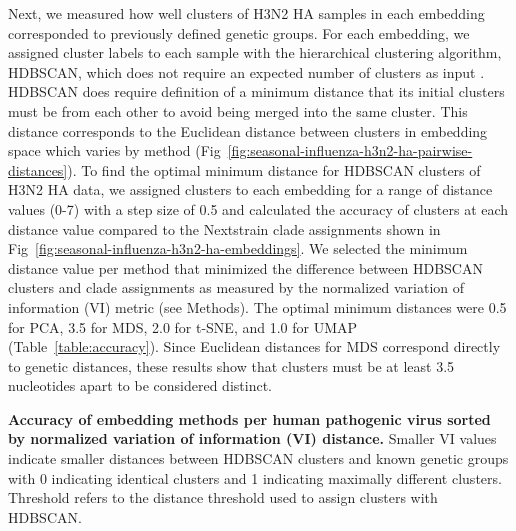 \documentclass[10pt,letterpaper]{article}
\begin{document}
Next, we measured how well clusters of H3N2 HA samples in each embedding corresponded to previously defined genetic groups.
For each embedding, we assigned cluster labels to each sample with the hierarchical clustering algorithm, HDBSCAN, which does not require an expected number of clusters as input \cite{campello2015hierarchical}.
HDBSCAN does require definition of a minimum distance that its initial clusters must be from each other to avoid being merged into the same cluster.
This distance corresponds to the Euclidean distance between clusters in embedding space which varies by method (Fig~\ref{fig:seasonal-influenza-h3n2-ha-pairwise-distances}).
To find the optimal minimum distance for HDBSCAN clusters of H3N2 HA data, we assigned clusters to each embedding for a range of distance values (0-7) with a step size of 0.5 and calculated the accuracy of clusters at each distance value compared to the Nextstrain clade assignments shown in Fig~\ref{fig:seasonal-influenza-h3n2-ha-embeddings}.
We selected the minimum distance value per method that minimized the difference between HDBSCAN clusters and clade assignments as measured by the normalized variation of information (VI) metric \cite{meilua2003comparing} (see Methods).
The optimal minimum distances were 0.5 for PCA, 3.5 for MDS, 2.0 for t-SNE, and 1.0 for UMAP (Table~\ref{table:accuracy}).
Since Euclidean distances for MDS correspond directly to genetic distances, these results show that clusters must be at least 3.5 nucleotides apart to be considered distinct.

\begin{table}[!ht]
\centering
\caption{
  {\bf Accuracy of embedding methods per human pathogenic virus sorted by normalized variation of information (VI) distance.}
  Smaller VI values indicate smaller distances between HDBSCAN clusters and known genetic groups with 0 indicating identical clusters and 1 indicating maximally different clusters.
  Threshold refers to the distance threshold used to assign clusters with HDBSCAN.}

\label{table:accuracy}
\end{table}
\end{document}
